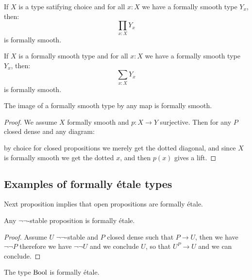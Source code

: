 \begin{lemma}
If $X$ is a type satifying choice and for all $x:X$ we have a formally smooth type $Y_x$, then:
\[\prod_{x:X}Y_x\]
is formally smooth.
\end{lemma}

\begin{lemma}
\label{smooth-sigma-closed}
If $X$ is a formally smooth type and for all $x:X$ we have a formally smooth type $Y_x$, then:
\[\sum_{x:X}Y_x\]
is formally smooth.
\end{lemma}

\begin{proposition}
\label{smoothSurjective}
The image of a formally smooth type by any map is formally smooth.
\end{proposition}

\begin{proof}
We assume $X$ formally smooth and $p:X\to Y$ surjective. Then for any $P$ closed dense and any diagram:
 \begin{center}
    \end{center} 
    by choice for closed propositions we merely get the dotted diagonal, and since $X$ is formally smooth we get the dotted $x$, and then $p(x)$ gives a lift.
\end{proof}



\subsection{Examples of formally étale types}

Next proposition implies that open propositions are formally étale.

\begin{proposition}%
  Any $\neg\neg$-stable proposition is formally étale.
\end{proposition}

\begin{proof}
  Assume $U$ $\neg\neg$-stable and $P$ closed dense such that $P\to U$, then we have $\neg\neg P$ therefore we have $\neg\neg U$ and we conclude $U$, so that $U^P\to U$ and we can conclude.
\end{proof}

\begin{proposition}\label{bool-is-etale}
  The type $\mathrm{Bool}$ is formally étale.
\end{proposition}

